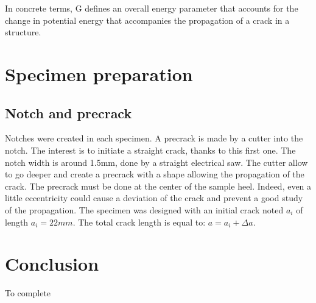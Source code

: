 In concrete terms, G defines an overall energy parameter that accounts for the change in potential energy that accompanies the propagation of a crack in a structure.

\section{Specimen preparation}

\subsection{Notch and precrack}

Notches were created in each specimen. A precrack is made by a cutter into the notch. The interest is to initiate a straight crack, thanks to this first one. The notch width is around 1.5mm, done by a straight electrical saw. The cutter allow to go deeper and create a precrack with a shape allowing the propagation of the crack. The precrack must be done at the center of the sample heel. Indeed, even a little eccentricity could cause a deviation of the crack and prevent a good study of the propagation. The specimen was designed with an initial crack noted $a_i$ of length  $a_i=22mm$. The total crack length is equal to: $a=a_i+\Delta a$.


\section{Conclusion}

To complete



